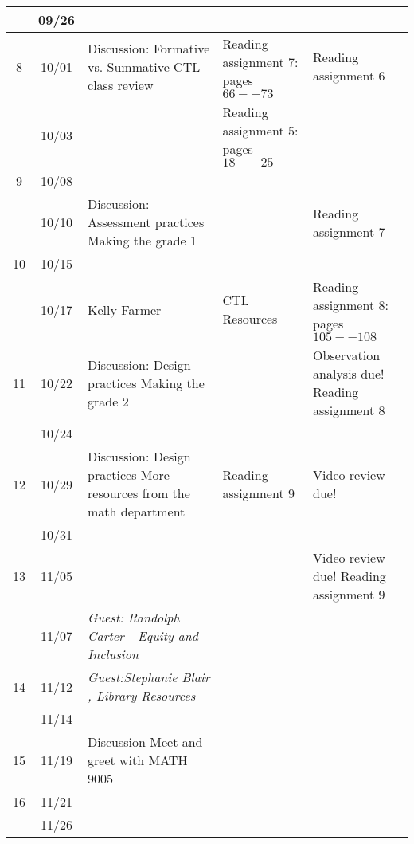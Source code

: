 \begin{longtable}{ |c|c|p{10em}|p{10em}|p{10em}| }
    & 09/26 &  {} & {} & {} \\ \hline

  8 & 10/01 &  {Discussion: Formative vs. Summative CTL class review}  
            & {Reading assignment 7: pages $66--73$} 
            & {Reading assignment 6} \\ \hline

    & 10/03 & {} 
            & {Reading assignment 5: pages $18--25$} & \\ \hline

  9 & 10/08 & 
             &
             & {} \\ \hline

     & 10/10 & {Discussion:  Assessment practices Making the grade 1}   & {}  & {Reading assignment 7} \\ \hline

  10 & 10/15 & {}   & {}  & {} \\ \hline

     & 10/17 & {Kelly Farmer} %
             & {CTL Resources}
             & {Reading assignment 8: pages $105--108$} \\ \hline

  11 & 10/22  & {Discussion:  Design practices Making the grade 2} 
              &  
              & {Observation analysis due! Reading assignment 8} \\ \hline

     & 10/24  & {} &  & {} \\ \hline

  12 & 10/29 &  {Discussion: Design practices More resources from the math department} 
             & {Reading assignment 9}  
             & {Video review due!} \\ \hline

     & 10/31 &  {} & {}  & {} \\ \hline

  13 & 11/05 & {} 
             & 
             & {Video review due! Reading assignment 9} \\ \hline %

     & 11/07 & \textit{Guest: Randolph Carter - Equity and Inclusion} %
             & 
             & {} \\ \hline %

  14 & 11/12 & \textit{Guest:Stephanie Blair , Library Resources}  %
             & 
             & {} \\ \hline %


     & 11/14 & {}
             & 
             & \\ \hline

     
  15 & 11/19 & {Discussion Meet and greet with MATH 9005} 
             & 
             & \\ \hline

  16 & 11/21 & {} & & \\ \hline

     & 11/26 &  {} & {}  & {} \\ \hline
\end{longtable}


